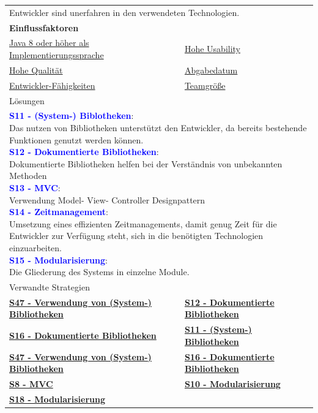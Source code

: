 \documentclass[enabledeprecatedfontcommands,fontsize=11pt,paper=a4,twoside]{scrartcl}
\newcounter{one}
\newcommand{\cb}[1]{{\textcolor{blue}{#1}}}
\begin{document}
\begin{tabular} {|p{8cm} p{8cm}|}
	\hline
	\rowcolor{prob}\multicolumn{2}{|l|}{\parbox{16cm}{\textbf{05: Unerfahrene Entwickler}}} \\  \hline\hline 
	\multicolumn{2}{|l|}{\parbox{16cm}{Entwickler sind unerfahren in den verwendeten Technologien.}}\rule{0pt}{1ex}\\ \hline
	\multicolumn{2}{|l|}{\textbf{Einflussfaktoren}}\\
	\hyperlink{b}{Java 8 oder höher als Implementierungssprache} &
	\hyperlink {g}{Hohe Usability}\\
	\hyperlink {h}{Hohe Qualität}&
	\hyperlink {uu}{Abgabedatum} \\
	\hyperlink {vv}{Entwickler-Fähigkeiten} &
	\hyperlink {xx}{Teamgröße} 
	\\ \hline
	\multicolumn{2}{|l|}{Lösungen} \\
	\multicolumn{2}{|l|}{\parbox{16cm}{
			\textbf{\cb{\hypertarget{ccc}{S11 - (System-) Biblotheken}}}: \\
			Das nutzen von Bibliotheken unterstützt den Entwickler, da bereits bestehende Funktionen genutzt werden können.\\
			\textbf{\cb{S12 - Dokumentierte Bibliotheken}}: \\
			Dokumentierte Bibliotheken helfen bei der Verständnis von unbekannten Methoden \\
			\textbf{\cb{\hypertarget{modelviewcontroller}{S13 - MVC}}}: \\
			Verwendung Model- View- Controller Designpattern\\
			\textbf{\cb{\hypertarget{zeitmanagement}{S14 - Zeitmanagement}}}: \\
			Umsetzung eines effizienten Zeitmanagements, damit genug Zeit für die Entwickler zur Verfügung steht, sich in die benötigten Technologien einzuarbeiten.\\
			\textbf{\cb{\hypertarget{aabb}{S15 - Modularisierung}}}: \\%
			Die Gliederung des Systems in einzelne Module.
	} }\\ [9ex] \hline
	\multicolumn{2}{|l|}{Verwandte Strategien} \\
	\textbf{\hyperlink {qqq}{S47 - Verwendung von (System-) Bibliotheken}} &
	\textbf{\hyperlink {aaaf}{S12 - Dokumentierte Bibliotheken}} \\
	\textbf{\hyperlink {ddd}{S16 - Dokumentierte Bibliotheken}} &
	\textbf{\hyperlink {ccc}{S11 - (System-) Bibliotheken}} \\
	\textbf{\hyperlink {qqq}{S47 - Verwendung von (System-) Bibliotheken}}& 
	\textbf{\hyperlink {ddd}{S16 - Dokumentierte Bibliotheken}} \\
	\textbf{\hyperlink {bbb}{S8 - MVC}} &
	\textbf{\hyperlink {aadd}{S10 - Modularisierung}} \\
	\textbf{\hyperlink {aacc}{S18 - Modularisierung}} &
	\\\hline
\end{tabular}\\ \\ \\
\end{document}
